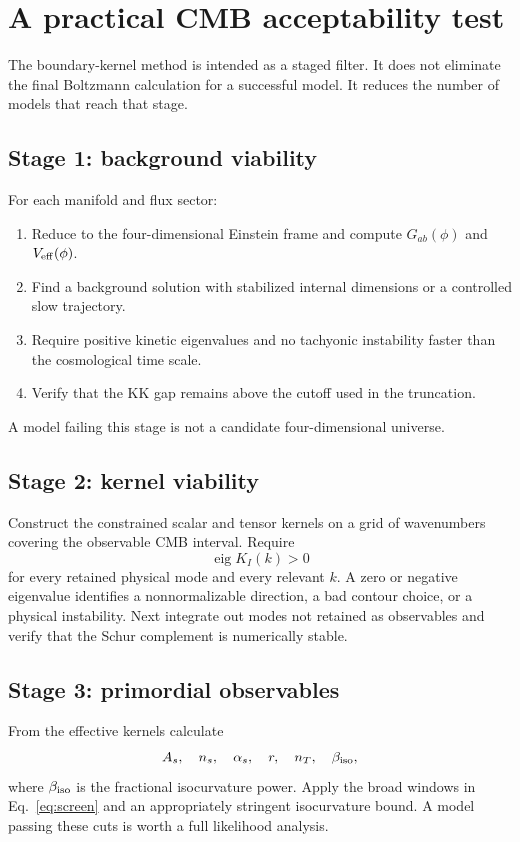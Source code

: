 \documentclass[aps,prd,twocolumn,superscriptaddress,nofootinbib,longbibliography]{revtex4-2}
\begin{document}
\section{A practical CMB acceptability test}
\label{sec:acceptance}

The boundary-kernel method is intended as a staged filter. It does not eliminate the final Boltzmann calculation for a successful model. It reduces the number of models that reach that stage.

\subsection{Stage 1: background viability}
For each manifold and flux sector:
\begin{enumerate}
\item Reduce to the four-dimensional Einstein frame and compute $G_{ab}(\phi)$ and $V_{\rm eff}(\phi)$.
\item Find a background solution with stabilized internal dimensions or a controlled slow trajectory.
\item Require positive kinetic eigenvalues and no tachyonic instability faster than the cosmological time scale.
\item Verify that the KK gap remains above the cutoff used in the truncation.
\end{enumerate}
A model failing this stage is not a candidate four-dimensional universe.

\subsection{Stage 2: kernel viability}
Construct the constrained scalar and tensor kernels on a grid of wavenumbers covering the observable CMB interval. Require
\begin{equation}
\operatorname{eig}K_I(k)>0
\end{equation}
for every retained physical mode and every relevant $k$. A zero or negative eigenvalue identifies a nonnormalizable direction, a bad contour choice, or a physical instability. Next integrate out modes not retained as observables and verify that the Schur complement is numerically stable.

\subsection{Stage 3: primordial observables}
From the effective kernels calculate
\begin{equation}
A_s,\quad n_s,\quad\alpha_s,\quad r,\quad n_T,
\quad\beta_{\rm iso},
\end{equation}
where $\beta_{\rm iso}$ is the fractional isocurvature power. Apply the broad windows in Eq.~\eqref{eq:screen} and an appropriately stringent isocurvature bound. A model passing these cuts is worth a full likelihood analysis.
\end{document}
